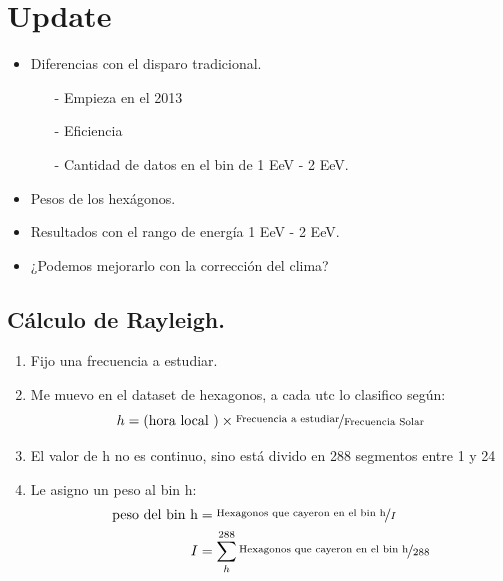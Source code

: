  

\section{Update}


  \begin{itemize}
  	\item Diferencias con el disparo tradicional.
    \begin{itemize}
      \item[-] Empieza en el 2013
      \item[-] Eficiencia
      \item[-] Cantidad de datos en el bin de 1 EeV - 2 EeV.
    \end{itemize}
  	\item Pesos de los hexágonos.
  	\item Resultados con el rango de energía 1 EeV - 2 EeV.
    \item ¿Podemos mejorarlo con la corrección del clima?
  \end{itemize}


 


\subsection{Cálculo de Rayleigh.}


 \begin{enumerate}
   \item Fijo una frecuencia a estudiar.
   \item Me muevo en el dataset de hexagonos, a cada utc lo clasifico según:
   \begin{equation*}
     h = (\text{hora local })\times \nicefrac{\text{Frecuencia a estudiar}}{\text{Frecuencia Solar}}
   \end{equation*}
     \item El valor de h no es continuo, sino está divido en 288 segmentos entre 1 y 24
  \item Le asigno un peso al bin h:
   \begin{align*}
     \text{peso del bin h} &= \nicefrac{\text{Hexagonos que cayeron en el bin h}}{I}\\
     I &= \sum^{288}_h \nicefrac{\text{Hexagonos que cayeron en el bin h}}{288}
    \end{align*} 

 \end{enumerate}

